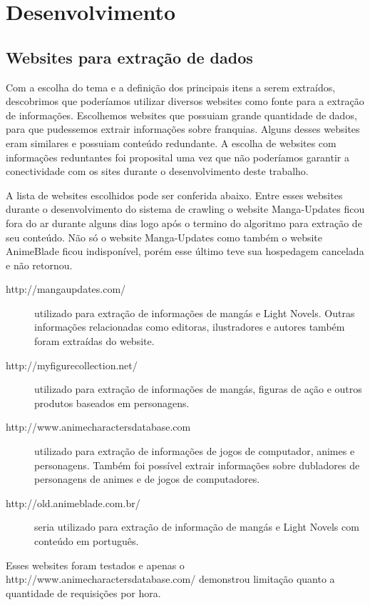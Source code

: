 \documentclass[12pt]{article}
\begin{document}
\section{Desenvolvimento}

\subsection{Websites para extração de dados}

Com a escolha do tema e a definição dos principais itens a serem extraídos, descobrimos que poderíamos utilizar diversos websites como fonte para a extração de informações. 
Escolhemos websites que possuiam grande quantidade de dados, para que pudessemos extrair informações sobre franquias. Alguns desses websites eram similares e possuiam conteúdo redundante. A escolha de websites com informações reduntantes foi proposital uma vez que não poderíamos garantir a conectividade com os sites durante o desenvolvimento deste trabalho.

A lista de websites escolhidos pode ser conferida abaixo. Entre esses websites durante o desenvolvimento do sistema de crawling o website Manga-Updates ficou fora do ar durante alguns dias logo após o termino do algoritmo para extração de seu conteúdo. Não só o website Manga-Updates como também o website AnimeBlade ficou indisponível, porém esse último teve sua hospedagem cancelada e não retornou.

\begin{description}
\item[http://mangaupdates.com/] utilizado para extração de informações de mangás e Light Novels. Outras informações relacionadas como editoras, ilustradores e autores também foram extraídas do website.
\item[http://myfigurecollection.net/] utilizado para extração de informações de mangás, figuras de ação e outros produtos baseados em personagens.
\item[http://www.animecharactersdatabase.com] utilizado para extração de informações de jogos de computador, animes e personagens. Também foi possível extrair informações sobre dubladores de personagens de animes e de jogos de computadores. 
\item[http://old.animeblade.com.br/] seria utilizado para extração de informação de mangás e Light Novels com conteúdo em português.
\end{description}


Esses websites foram testados e apenas o http://www.animecharactersdatabase.com/ demonstrou limitação quanto a quantidade de requisições por hora.
\end{document}

